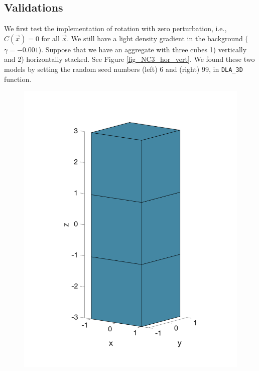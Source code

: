 \subsection{Validations}\label{validation_rot}
We first test the implementation of rotation with zero perturbation, i.e.,  $C(\vec{x}) = 0$ for all $\vec{x}$. 
We still have a light density gradient in the background ($\gamma = - 0.001$). Suppose that we have an aggregate with three cubes 1) vertically and 2) horizontally stacked. See Figure \ref{fig_NC3_hor_vert}. We found these two models by setting the random seed numbers (left) 6 and (right) 99, in \verb+DLA_3D+ function. 
    \begin{figure}[h]
    	\begin{center}
    		\vspace{0.5cm}
			\includegraphics[scale=0.25]{./figures/fig_NC3_ver}		
			\hspace{20mm}

\end{center}
\end{figure}
